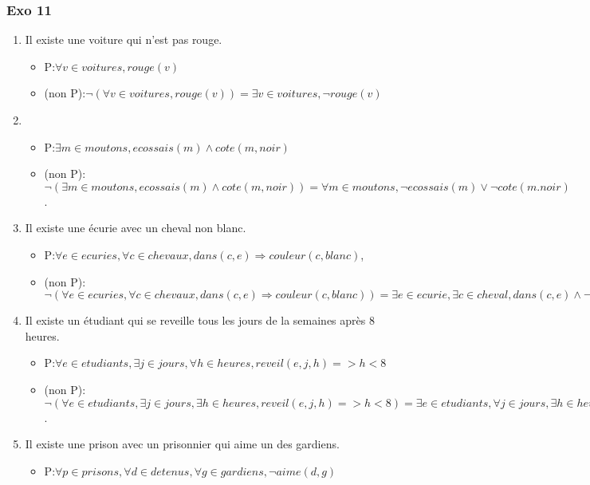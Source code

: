 \documentclass[]{book}
\theoremstyle{definition}
\begin{document}
\subsubsection*{Exo 11}
\begin{enumerate}
\item Il existe une voiture qui n'est pas rouge. 
\begin{itemize}
\item P:$\forall v \in voitures, rouge(v)$
\item (non P):$\lnot(\forall v \in voitures, rouge(v)) = \exists v \in voitures, \lnot rouge(v)$
\end{itemize}
\item 
\begin{itemize}
\item P:$\exists m \in moutons, ecossais(m) \land cote(m, noir)$
\item (non P):$\lnot(\exists m \in moutons, ecossais(m) \land cote(m, noir)) = \forall m \in moutons, \lnot ecossais(m) \lor \lnot cote(m. noir)$.
\end{itemize}
\item Il existe une \'ecurie avec un cheval non blanc. 
\begin{itemize}
\item P:$\forall e \in ecuries, \forall c \in chevaux, dans(c,e) \Rightarrow couleur(c,blanc)$,
\item (non P): $\lnot(\forall e \in ecuries, \forall c \in chevaux, dans(c,e) \Rightarrow couleur(c,blanc)) = \exists e \in ecurie, \exists c \in cheval, dans(c,e) \land \lnot couleur(blanc,c)$
\end{itemize}
\item Il existe un \'etudiant qui se reveille tous les jours de la semaines apr\`es 8 heures. 
\begin{itemize}
\item P:$\forall e \in etudiants, \exists j \in jours, \forall h \in heures, reveil(e, j, h) => h < 8$
\item (non P): $\lnot(\forall e \in etudiants, \exists j \in jours, \exists h \in heures, reveil(e, j, h) => h < 8) = \exists e \in etudiants, \forall j \in jours, \exists h \in heures, reveil(e, j, h) \land h > 8$.
\end{itemize}
\item Il existe une prison avec un prisonnier qui aime un des gardiens.
\begin{itemize}
\item P:$\forall p \in prisons, \forall d \in detenus, \forall g \in gardiens, \lnot aime(d, g)$

\end{itemize}
\end{enumerate}
\end{document}
